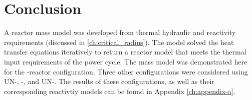 \section{Conclusion}
A reactor mass model was developed from thermal hydraulic and reactivity
requirements (discussed in \ref{ch:critical_radius}). The model solved the heat
transfer equations iteratively to return a reactor model that meets the thermal
input requirements of the power cycle. The mass model was demonstrated here for
the \uox-\codiox  reactor configuration. Three other configurations were
considered using UN-\codiox, \uox-\water, and UN-\water. The results of these
configurations, as well as their corresponding reactivtiy models can be found in
Appendix \ref{ch:appendix-a}.

